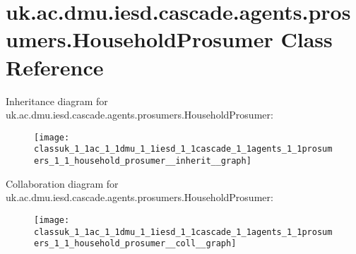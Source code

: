 \hypertarget{classuk_1_1ac_1_1dmu_1_1iesd_1_1cascade_1_1agents_1_1prosumers_1_1_household_prosumer}{\section{uk.\-ac.\-dmu.\-iesd.\-cascade.\-agents.\-prosumers.\-Household\-Prosumer Class Reference}
\label{classuk_1_1ac_1_1dmu_1_1iesd_1_1cascade_1_1agents_1_1prosumers_1_1_household_prosumer}
}


Inheritance diagram for uk.\-ac.\-dmu.\-iesd.\-cascade.\-agents.\-prosumers.\-Household\-Prosumer\-:\nopagebreak
\begin{figure}[H]
\begin{center}
\leavevmode
\texttt{[image: classuk\_1\_1ac\_1\_1dmu\_1\_1iesd\_1\_1cascade\_1\_1agents\_1\_1prosumers\_1\_1\_household\_prosumer\_\_inherit\_\_graph]}
\end{center}
\end{figure}


Collaboration diagram for uk.\-ac.\-dmu.\-iesd.\-cascade.\-agents.\-prosumers.\-Household\-Prosumer\-:\nopagebreak
\begin{figure}[H]
\begin{center}
\leavevmode
\texttt{[image: classuk\_1\_1ac\_1\_1dmu\_1\_1iesd\_1\_1cascade\_1\_1agents\_1\_1prosumers\_1\_1\_household\_prosumer\_\_coll\_\_graph]}
\end{center}
\end{figure}
